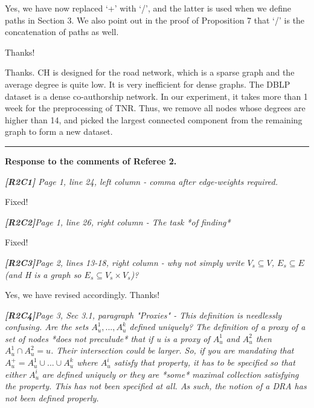 \documentclass[11pt]{letter}
\newcommand{\vs}{\vspace{1ex}}
\newcommand{\svs}{\vspace{0.36ex}}
\begin{document}
\svs


\svs
Yes, we have now replaced `+' with `/', and the latter is used when we define paths in Section 3. 
We also point out in the proof of Proposition 7 that `/' is the concatenation of paths as well.

Thanks!


\svs
Thanks. CH is designed for the road network, which is a sparse graph and the average degree is quite low. It is very inefficient for dense graphs. The DBLP dataset is a dense co-authorship network. In our experiment, it takes more than 1 week for the preprocessing of TNR. Thus, we remove all nodes whose degrees are higher than 14, and picked the largest connected component from the remaining graph to form a new dataset.





\vspace{2.8ex}
\hrule
\vspace{0.6ex}
{\bf Response to the comments of Referee 2.}



\vs
\noindent
{\em
{\bf [R2C1]}
 Page 1, line 24, left column - comma after edge-weights required.}
\svs

Fixed!

\vs
\noindent
{\em
{\bf [R2C2]}Page 1, line 26, right column - The task *of finding*}
\svs

Fixed!

\vs
\noindent
{\em
{\bf [R2C3]}Page 2, lines 13-18, right column - why not simply write $V_s \subseteq V$, $E_s \subseteq E$ (and H is a graph so $E_s \subseteq V_s \times V_s$)?
}
\svs

Yes, we have revised accordingly. Thanks!


\vs
\noindent
{\em{\bf[R2C4]}Page 3, Sec 3.1, paragraph "Proxies" - This definition is needlessly confusing. Are the sets $A_u^1, ..., A_u^k$ defined uniquely? The definition of a proxy of a set of nodes *does not preculude* that
if u is a proxy of $A_u^1$ and $A_u^2$ then $A_u^1 \cap A_u^2 = {u}$.
Their intersection could be larger. So, if you are mandating that
$A_u^+ = A_u^1 \cup ... \cup A_u^k$ where $A_u^i$ satisfy that property,
it has to be specified so that either $A_u^i$ are defined uniquely or
they are *some* maximal collection satisfying the property. This
has not been specified at all. As such, the notion of a DRA has
not been defined properly.}
\svs
\end{document}
